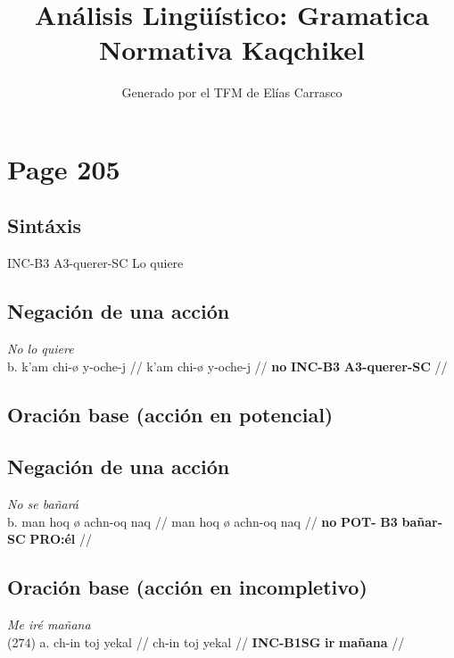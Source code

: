 \documentclass{article}%
\title{Análisis Lingüístico: Gramatica Normativa Kaqchikel}%
\author{Generado por el TFM de Elías Carrasco}%
\begin{document}
%
\normalsize%
\maketitle%
\section{Page 205}%
\label{sec:Page205}%
\subsection{Sintáxis}%
\label{subsec:Sintxis}%

%
INC{-}B3 %
A3{-}querer{-}SC %
Lo quiere %
\subsection{Negación de una acción}%
\label{subsec:Negacindeunaaccin}%

%
\par\medskip%
\ex
\textit{No lo quiere} \\
\begingl
\gla b. k'am chi-ø y-oche-j //
\glb k'am chi-ø y-oche-j //
\glc \textbf{no} \textbf{INC-}\textbf{B3} \textbf{A3-}\textbf{querer-}\textbf{SC} //
\endgl
\xe
%
\medskip%
\subsection{Oración base (acción en potencial)}%
\label{subsec:Oracinbase(accinenpotencial)}%

%
\subsection{Negación de una acción}%
\label{subsec:Negacindeunaaccin}%

%
\par\medskip%
\ex
\textit{No se bañará} \\
\begingl
\gla b. man hoq ø achn-oq naq //
\glb man hoq ø achn-oq naq //
\glc \textbf{no} \textbf{POT-} \textbf{B3} \textbf{bañar-SC} \textbf{PRO:él} //
\endgl
\xe
%
\medskip%
\subsection{Oración base (acción en incompletivo)}%
\label{subsec:Oracinbase(accinenincompletivo)}%

%
\par\medskip%
\ex
\textit{Me iré mañana} \\
\begingl
\gla (274) a. ch-in toj yekal //
\glb ch-in toj yekal //
\glc \textbf{INC-}\textbf{B1SG} \textbf{ir} \textbf{mañana} //
\endgl
\xe
%
\medskip%
\end{document}
